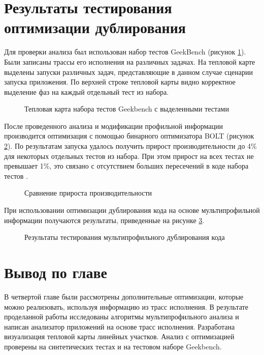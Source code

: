 \section{Результаты тестирования оптимизации дублирования}\label{sec:ch4/sect3}
Для проверки анализа был использован набор тестов GeekBench (рисунок \cref{fig:GKBMP}). Были записаны трассы его исполнения на различных задачах. На тепловой карте выделены запуски различных задач, представляющие в данном случае сценарии запуска приложения. По верхней строке тепловой карты видно корректное выделение фаз на каждый отдельный тест из набора.

\begin{figure}[!h]
    \centerfloat{
        \texttt{[image: \_16]}
    }
    \caption{Тепловая карта набора тестов Geekbench с выделенными тестами}\label{fig:GKBMP}
\end{figure}

После проведенного анализа и модификации профильной информации производится оптимизация с помощью бинарного оптимизатора BOLT (рисунок \cref{fig:CmpPerfGKB}). По результатам запуска удалось получить прирост производительности до 4\% для некоторых отдельных тестов из набора. При этом прирост на всех тестах не превышает 1\%, это связано с отсутствием больших пересечений в коде набора тестов \cite{vakbib2}.
 
\begin{figure}[!h]
    \centerfloat{
        \texttt{[image: \_18]}
    }
    \caption{Сравнение прироста производительности}\label{fig:CmpPerfGKB}
\end{figure}

При использовании оптимизации дублирования кода на основе мультипрофильной информации получаются результаты, приведенные на рисунке \cref{fig:MPResGKB}.


\begin{figure}[!h]
    \caption{Результаты тестирования мультипрофильного дублирования кода}\label{fig:MPResGKB}
\end{figure}

\section{Вывод по главе}\label{sec:ch4/sect3}
В четвертой главе были рассмотрены дополнительные оптимизации, которые можно реализовать, используя информацию из трасс исполнения. В результате проделанной работы исследованы алгоритмы мультипрофильного анализа и написан анализатор приложений на основе трасс исполнения. Разработана визуализация тепловой карты линейных участков. Анализ с оптимизацией проверены на синтетических тестах и на тестовом наборе Geekbench.


\clearpage
